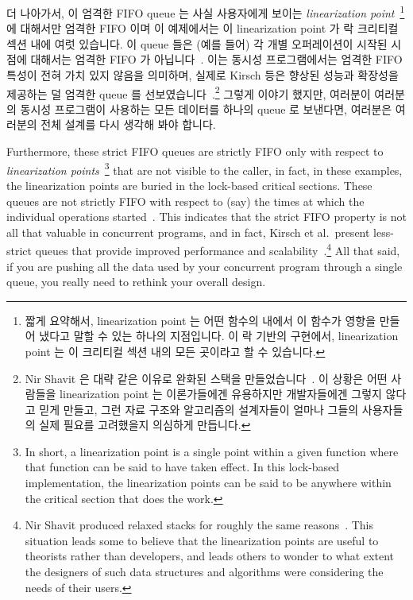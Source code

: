 더 나아가서, 이 엄격한 FIFO queue 는 사실 사용자에게 보이는 \emph{linearization
point}~\cite{Herlihy:1990:LCC:78969.78972}\footnote{
	짧게 요약해서, linearization point 는 어떤 함수의 내에서 이 함수가
	영향을 만들어 냈다고 말할 수 있는 하나의 지점입니다.
	이 락 기반의 구현에서, linearization point 는 이 크리티컬 섹션 내의
	모든 곳이라고 할 수 있습니다.}
에 대해서만 엄격한 FIFO 이며 이 예제에서는 이 linearization point 가 락
크리티컬 섹션 내에 여럿 있습니다.
이 queue 들은 (예를 들어) 각 개별 오퍼레이션이 시작된 시점에 대해서는 엄격한
FIFO 가 아닙니다~\cite{AndreasHaas2012FIFOisnt}.
이는 동시성 프로그램에서는 엄격한 FIFO 특성이 전혀 가치 있지 않음을 의미하며,
실제로 Kirsch 등은 향상된 성능과 확장성을 제공하는 덜 엄격한 queue 를
선보였습니다~\cite{ChristophMKirsch2012FIFOisntTR}.\footnote{
	Nir Shavit 은 대략 같은 이유로 완화된 스택을
	만들었습니다~\cite{Shavit:2011:DSM:1897852.1897873}.
	이 상황은 어떤 사람들을 linearization point 는 이론가들에겐 유용하지만
	개발자들에겐 그렇지 않다고 믿게 만들고, 그런 자료 구조와 알고리즘의
	설계자들이 얼마나 그들의 사용자들의 실제 필요를 고려했을지 의심하게
	만듭니다.}
그렇게 이야기 했지만, 여러분이 여러분의 동시성 프로그램이 사용하는 모든
데이터를 하나의 queue 로 보낸다면, 여러분은 여러분의 전체 설계를 다시 생각해
봐야 합니다.

\iffalse

Furthermore, these strict FIFO queues are strictly FIFO only with
respect to
\emph{linearization points}~\cite{Herlihy:1990:LCC:78969.78972}\footnote{
	In short, a linearization point is a single point within a given
	function where that function can be said to have taken effect.
	In this lock-based implementation, the linearization points
	can be said to be anywhere within the critical section that
	does the work.}
that are not visible to the caller, in fact, in these examples,
the linearization points are buried in the lock-based critical
sections.
These queues are not strictly FIFO with respect to (say) the times at which
the individual operations started~\cite{AndreasHaas2012FIFOisnt}.
This indicates that the strict FIFO property is not all that valuable
in concurrent programs, and in fact, Kirsch et al.\ present less-strict
queues that provide improved performance and
scalability~\cite{ChristophMKirsch2012FIFOisntTR}.\footnote{
	Nir Shavit produced relaxed stacks for roughly the same
	reasons~\cite{Shavit:2011:DSM:1897852.1897873}.
	This situation leads some to believe that the linearization
	points are useful to theorists rather than developers, and
	leads others to wonder to what extent the designers of such
	data structures and algorithms were considering the needs
	of their users.}
All that said, if you are pushing all the data used by your concurrent
program through a single queue, you really need to rethink your
overall design.

